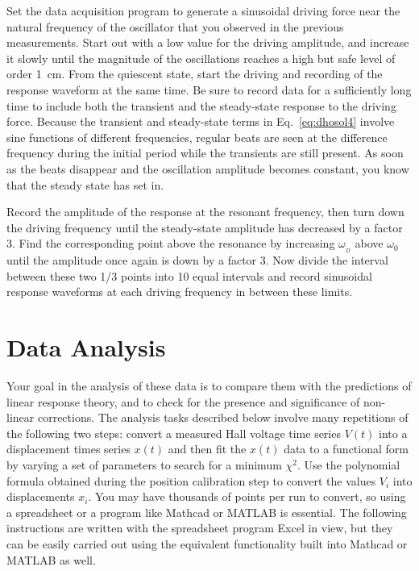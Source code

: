 \documentclass{revtex4}
\begin{document}
Set the data acquisition program to generate a sinusoidal driving force near
the natural frequency of the oscillator that you observed in the previous
measurements.  Start out with a low value for the driving amplitude, and
increase it slowly until the magnitude of the oscillations reaches a high
but safe level of order 1~cm.  From the quiescent state, start the driving
and recording of the response waveform at the same time.  Be sure to record
data for a sufficiently long time to include both the transient and the
steady-state response to the driving force.  Because the transient and
steady-state terms in Eq.~\ref{eq:dhosol4} involve sine functions of 
different frequencies, regular beats are seen at the difference frequency
during the initial period while the transients are still present.  As soon
as the beats disappear and the oscillation amplitude becomes constant, you
know that the steady state has set in.

Record the amplitude of the response at the resonant frequency, then turn
down the driving frequency until the steady-state amplitude has decreased
by a factor 3.  Find the corresponding point above the resonance by increasing
$\omega_{_D}$ above $\omega_0$ until the amplitude once again is down by a
factor 3.  Now divide the interval between these two 1/3 points into 10
equal intervals and record sinusoidal response waveforms at each driving
frequency in between these limits.

\section{Data Analysis}

Your goal in the analysis of these data is to compare them with the
predictions of linear response theory, and to check for the presence and
significance of non-linear corrections.  The analysis tasks described
below involve many repetitions of the following two steps: convert a
measured Hall voltage time series $V(t)$ into a displacement times series
$x(t)$ and then fit the $x(t)$ data to a functional form by varying a set
of parameters to search for a minimum $\chi^2$.  Use the polynomial formula
obtained during the position calibration step to convert the values $V_i$
into displacements $x_i$.  You may have thousands of points per run to
convert, so using a spreadsheet or a program like Mathcad or MATLAB is
essential.  The following instructions are written with the spreadsheet
program Excel in view, but they can be easily carried out using the
equivalent functionality built into Mathcad or MATLAB as well.
\end{document}
